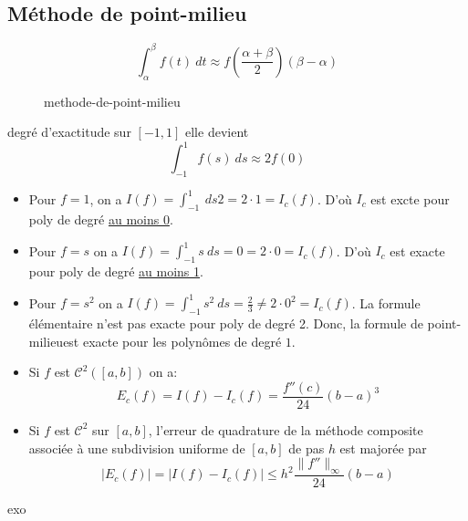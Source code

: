 \subsection{Méthode de point-milieu}
\begin{definition}
    \[
    \int_{{\alpha}}^{{\beta}} {f(t)} \: d{t} \approx f(\frac{\alpha + \beta}{2})(\beta - \alpha)
    \] 
\begin{figure}[H]
    \centering
    \caption{methode-de-point-milieu}
    \label{fig:methode-de-point-milieu}
\end{figure}
\end{definition}
\begin{eg} degré d'exactitude sur $[-1, 1]$ elle devient
     \[
    \int_{{-1}}^{{1}} {f(s)} \: d{s} \approx 2f(0)
    \] 
    \begin{itemize}
        \item Pour $f = 1$, on a  $I(f) = \int_{{-1}}^{{1}} {} \: d{s} 2 = 2 \cdot 1 = I_c(f)$. D'où $I_c$ est excte pour poly de degré \underline{au moins 0}.
        \item Pour  $f = s$ on a  $I(f) = \int_{{-1}}^{{1}} {s} \: d{s} = 0 = 2 \cdot 0 = I_c(f)$. D'où $I_c$ est exacte pour poly de degré \underline{au moins 1}.
        \item  Pour  $f = s^2$ on a  $I(f) = \int_{{-1}}^{{1}} {s^2} \: d{s} = \frac{2}{3} \neq  2 \cdot 0^2 = I_c(f)$. La formule élémentaire n'est pas exacte pour poly de degré 2. Donc, la formule de point-milieuest exacte pour les polynômes de degré $1$.
    \end{itemize}
\end{eg}
\begin{prop}
    \begin{itemize}
        \item Si $f$ est  $\mathcal{C}^2([a, b])$ on a:
             \[
            E_c(f) = I(f) - I_c(f) = \frac{f''(c)}{24}(b - a)^3
            \] 
        \item Si $f$ est  $\mathcal{C}^2$ sur  $[a, b]$, l'erreur de quadrature de la méthode composite associée à une subdivision uniforme de  $[a, b]$ de pas  $h$ est majorée par
             \[
            \left| E_c(f) \right| = \left| I(f) - I_c(f) \right| \le h^2 \frac{\|f''\|_{\infty}}{24}(b - a)
            \] 
    \end{itemize}
\end{prop}
\begin{preuve}
   exo 
\end{preuve}

